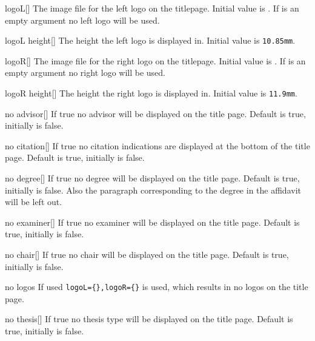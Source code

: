 \begin{describeopt}{logoL}[]
  The image file for the left logo on the titlepage. Initial value is
  . If  is an empty argument no left
  logo will be used.
\end{describeopt}
\begin{describeopt}{logoL height}[]
  The height the left logo is displayed in. Initial value is \verb|10.85mm|.
\end{describeopt}
\begin{describeopt}{logoR}[]
  The image file for the right logo on the titlepage. Initial value is
  . If  is an empty argument no right
  logo will be used.
\end{describeopt}
\begin{describeopt}{logoR height}[]
  The height the right logo is displayed in. Initial value is \verb|11.9mm|.
\end{describeopt}
\begin{describeopt}{no advisor}[]
  If true no advisor will be displayed on the title page. Default is true,
  initially is false.
\end{describeopt}
\begin{describeopt}{no citation}[]
  If true no citation indications are displayed at the bottom of the title page.
  Default is true, initially is false.
\end{describeopt}
\begin{describeopt}{no degree}[]
  If true no degree will be displayed on the title page. Default is true,
  initially is false. Also the paragraph corresponding to the degree in the
  affidavit will be left out.
\end{describeopt}
\begin{describeopt}{no examiner}[]
  If true no examiner will be displayed on the title page. Default is true,
  initially is false.
\end{describeopt}
\begin{describeopt}{no chair}[]
  If true no chair will be displayed on the title page. Default is true,
  initially is false.
\end{describeopt}
\begin{describeopt}{no logos}
  If used \verb|logoL={},logoR={}| is used, which results in no logos on the
  title page.
\end{describeopt}
\begin{describeopt}{no thesis}[]
  If true no thesis type will be displayed on the title page. Default is true,
  initially is false.
\end{describeopt}
